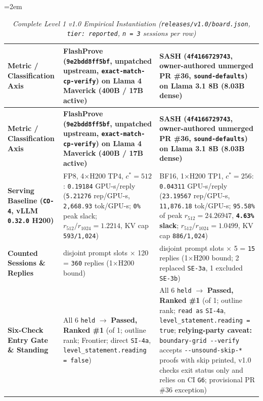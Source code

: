 \documentclass[11pt,letterpaper]{article}
\begin{document}
{\footnotesize\setlength{\tabcolsep}{4pt}\emergencystretch=2em
\begin{longtable}{@{}>{\raggedright\arraybackslash}p{} >{\raggedright\arraybackslash}p{} >{\raggedright\arraybackslash}p{}@{}}
\caption{\textit{Complete Level 1 v1.0 Empirical Instantiation (\texttt{releases/\allowbreak{}v1.0/\allowbreak{}board.\allowbreak{}json}, \texttt{tier: reported}, \texttt{n = 3} sessions per row)} \cite{iproofs2026,rinberg2026flashprove,sash2026}} \\
\toprule
\textbf{Metric / Classification Axis} & \textbf{FlashProve (\texttt{9e2bdd8ff5bf}, unpatched upstream, \texttt{exact-\allowbreak{}match-\allowbreak{}cp-\allowbreak{}verify}) on Llama 4 Maverick (400B / 17B active)} & \textbf{SASH (\texttt{4f4166729743}, \textbf{owner-authored unmerged PR \#36}, \texttt{sound-\allowbreak{}defaults}) on Llama 3.1 8B (8.03B dense)} \\
\midrule
\endfirsthead
\toprule
\textbf{Metric / Classification Axis} & \textbf{FlashProve (\texttt{9e2bdd8ff5bf}, unpatched upstream, \texttt{exact-\allowbreak{}match-\allowbreak{}cp-\allowbreak{}verify}) on Llama 4 Maverick (400B / 17B active)} & \textbf{SASH (\texttt{4f4166729743}, \textbf{owner-authored unmerged PR \#36}, \texttt{sound-\allowbreak{}defaults}) on Llama 3.1 8B (8.03B dense)} \\
\midrule
\endhead
\bottomrule
\endfoot
\textbf{Serving Baseline (\texttt{CO-4}, vLLM \texttt{0.32.0} H200)} & FP8, 4$\times$H200 TP4, $c^*=512$: \texttt{0.19184} GPU-s/reply (\texttt{5.21276} rep/GPU-s, \texttt{2,668.93} tok/GPU-s; \texttt{0\%} peak slack; $r_{512}/r_{1024}=1.2214$, KV cap \texttt{593/\allowbreak{}1,024}) & BF16, 1$\times$H200 TP1, $c^*=256$: \texttt{0.04311} GPU-s/reply (\texttt{23.19567} rep/GPU-s, \texttt{11,876.18} tok/GPU-s; \texttt{95.58\%} of peak $r_{512}=24.26947$, \textbf{\texttt{4.63\%} slack}; $r_{512}/r_{1024}=1.0499$, KV cap \texttt{886/\allowbreak{}1,024}) \\
\textbf{Counted Sessions \& Replies} & 3 disjoint prompt slots $\times$ 120 = \texttt{360} replies (1$\times$H200 bound) & 3 disjoint prompt slots $\times$ 5 = \texttt{15} replies (1$\times$H200 bound; 2 replaced \texttt{SE-3a}, 1 excluded \texttt{SE-3b}) \\
\textbf{Six-Check Entry Gate \& Standing} & All 6 \texttt{held} $\rightarrow$ \textbf{Passed, Ranked \#1} (of 1; outline rank; Frontier; direct \texttt{SI-4a}, \texttt{level\_\allowbreak{}statement.\allowbreak{}reading = false}) & All 6 \texttt{held} $\rightarrow$ \textbf{Passed, Ranked \#1} (of 1; outline rank; \texttt{read as} \texttt{SI-4a}, \texttt{level\_\allowbreak{}statement.\allowbreak{}reading = true}; \textbf{relying-party caveat:} \texttt{boundary-\allowbreak{}grid -{}-verify} accepts \texttt{-{}-unsound-\allowbreak{}skip-*} proofs with skip printed, v1.0 checks exit status only and relies on CI \texttt{G6}; provisional PR \#36 exception) \\

\end{longtable}}
\end{document}
